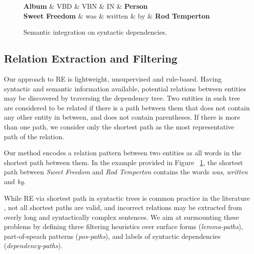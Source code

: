 \begin{figure}[!htb]
\centering
\begin{dependency}
\begin{deptext}[column sep=.0cm]
\textbf{Album} \& VBD \& VBN \& IN \& \textbf{Person} \\
\textbf{Sweet Freedom} \& was \& written \& by \& \textbf{Rod Temperton} \\
\end{deptext}



\end{dependency}
\vspace*{-5mm}
\caption{Semantic integration on syntactic dependencies.}
\label{fig:sampletree_combined}
\end{figure}


\subsection{Relation Extraction and Filtering}
\label{sec:re-filtering}

Our approach to RE is lightweight, unsupervised and rule-based. Having syntactic and semantic information available, potential relations between entities may be discovered by traversing the dependency tree.
Two entities in such tree are considered to be related if there is a path between them that does not contain any other entity in between, and does not contain parentheses. If there is more than one path, we consider only the shortest path as the most representative path of the relation.

Our method encodes a relation pattern between two entities as all words in the shortest path between them. In the example provided in Figure ~\ref{fig:sampletree_combined}, the shortest path between \emph{Sweet Freedom} and \emph{Rod Temperton} contains the words \textit{was}, \textit{written} and \textit{by}.

While RE via shortest path in syntactic trees is common practice in the literature \cite{DelliBovietal2015b,MoroandNavigli2012,Nakasholeetal2012}, not all shortest paths are valid, and incorrect relations may be extracted from overly long and syntactically complex sentences. We aim at surmounting these problems by defining three filtering heuristics over surface forms (\textit{lemma-paths}), part-of-speach patterns (\textit{pos-paths}), and labels of syntactic dependencies (\textit{dependency-paths}).

